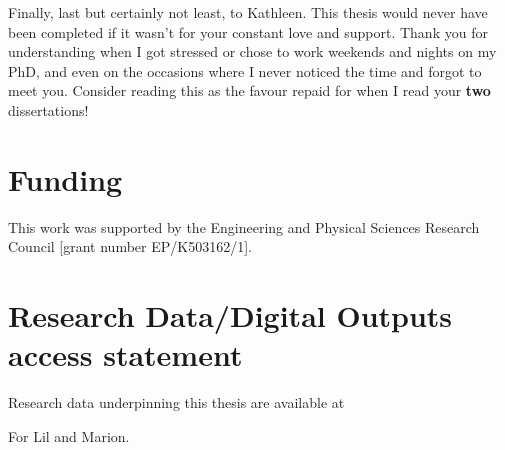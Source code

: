 \documentclass[10pt,a4paper,twoside]{book}
\begin{document}
Finally, last but certainly not least, to Kathleen.
This thesis would never have been completed if it wasn't for your constant love and support.
Thank you for understanding when I got stressed or chose to work weekends and nights on my PhD, and even on the occasions where I never noticed the time and forgot to meet you.
\noindent Consider reading this as the favour repaid for when I read your \textbf{two} dissertations!

\newpage
\section*{Funding}

This work was supported by the Engineering and Physical Sciences Research Council [grant number EP/K503162/1].

\section*{Research Data/Digital Outputs access statement}


Research data underpinning this thesis are available at 
\null\newpage
\null\newpage
\null\newpage
\begin{center}
    \vspace*{\fill}
    For Lil and Marion.
    \vspace*{\fill}
\end{center}
\clearpage
\null\newpage

\tableofcontents
\printnoidxglossaries
\newpage

\renewcommand{\cftdotsep}{\cftnodots}%

\listoffigures
{}

\mainmatter











\end{document}
